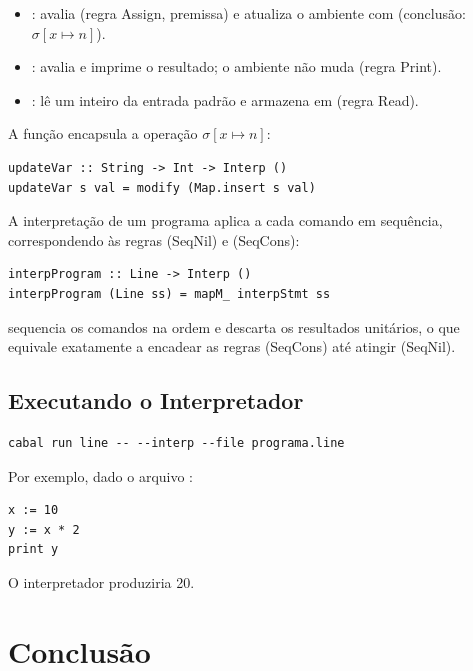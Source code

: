 \begin{itemize}
  \item {}: avalia
     (regra Assign, premissa) e
    atualiza o ambiente com 
    (conclusão: \(\sigma[x \mapsto n]\)).
  \item {}: avalia
     e imprime o resultado; o ambiente não
    muda (regra Print).
  \item {}: lê um inteiro da entrada
    padrão e armazena em  (regra Read).
\end{itemize}

A função  encapsula a operação
\(\sigma[x \mapsto n]\):

\begin{verbatim}
updateVar :: String -> Int -> Interp ()
updateVar s val = modify (Map.insert s val)
\end{verbatim}

A interpretação de um programa aplica
 a cada comando em sequência,
correspondendo às regras (SeqNil) e (SeqCons):

\begin{verbatim}
interpProgram :: Line -> Interp ()
interpProgram (Line ss) = mapM_ interpStmt ss
\end{verbatim}

 sequencia os comandos na ordem e
descarta os resultados unitários, o que equivale exatamente a
encadear as regras (SeqCons) até atingir (SeqNil).

\subsection{Executando o Interpretador}

\begin{verbatim}
cabal run line -- --interp --file programa.line
\end{verbatim}

Por exemplo, dado o arquivo :

\begin{verbatim}
x := 10
y := x * 2
print y
\end{verbatim}

O interpretador produziria 20.

\section{Conclusão}

